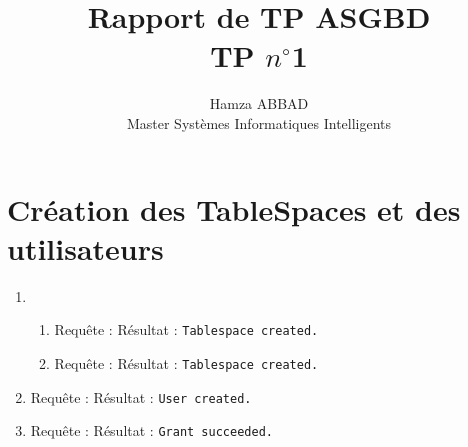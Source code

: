 \documentclass[12pt,a4paper]{article}
\author{Hamza ABBAD\\ Master Systèmes Informatiques Intelligents}
\title{\textbf{Rapport de TP ASGBD} \\ TP $n^{\circ}$1}
\begin{document}
\maketitle
\section{Création des TableSpaces et des utilisateurs}
	\begin{enumerate}
		\item
		\begin{enumerate}
			\item Requête : 
				Résultat : \texttt{Tablespace created.}
			\item Requête : 
			Résultat : \texttt{Tablespace created.}
		\end{enumerate}
		\item Requête : 
			Résultat : \texttt{User created.}
		\item Requête : 
			Résultat : \texttt{Grant succeeded.}
	\end{enumerate}
\end{document}
